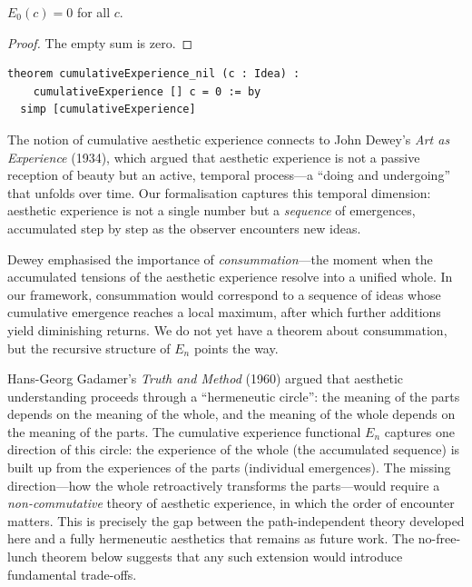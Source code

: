 \begin{theorem}
\label{thm:experience-empty}
$E_0(c) = 0$ for all $c$.
\end{theorem}

\begin{proof}
The empty sum is zero.
\end{proof}

\begin{lstlisting}
theorem cumulativeExperience_nil (c : Idea) :
    cumulativeExperience [] c = 0 := by
  simp [cumulativeExperience]
\end{lstlisting}

\begin{interpretation}
\label{int:experience-dewey}
The notion of cumulative aesthetic experience connects to John Dewey's
\emph{Art as Experience} (1934), which argued that aesthetic experience is
not a passive reception of beauty but an active, temporal process---a
``doing and undergoing'' that unfolds over time.  Our formalisation captures
this temporal dimension: aesthetic experience is not a single number but a
\emph{sequence} of emergences, accumulated step by step as the observer
encounters new ideas.

Dewey emphasised the importance of \emph{consummation}---the moment when
the accumulated tensions of the aesthetic experience resolve into a unified
whole.  In our framework, consummation would correspond to a sequence of
ideas whose cumulative emergence reaches a local maximum, after which
further additions yield diminishing returns.  We do not yet have a theorem
about consummation, but the recursive structure of $E_n$ points the way.
\end{interpretation}

\begin{remark}
Hans-Georg Gadamer's \textit{Truth and Method} (1960) argued that aesthetic understanding proceeds through a ``hermeneutic circle'': the meaning of the parts depends on the meaning of the whole, and the meaning of the whole depends on the meaning of the parts.  The cumulative experience functional $E_n$ captures one direction of this circle: the experience of the whole (the accumulated sequence) is built up from the experiences of the parts (individual emergences).  The missing direction---how the whole retroactively transforms the parts---would require a \emph{non-commutative} theory of aesthetic experience, in which the order of encounter matters.  This is precisely the gap between the path-independent theory developed here and a fully hermeneutic aesthetics that remains as future work.  The no-free-lunch theorem below suggests that any such extension would introduce fundamental trade-offs.
\end{remark}

